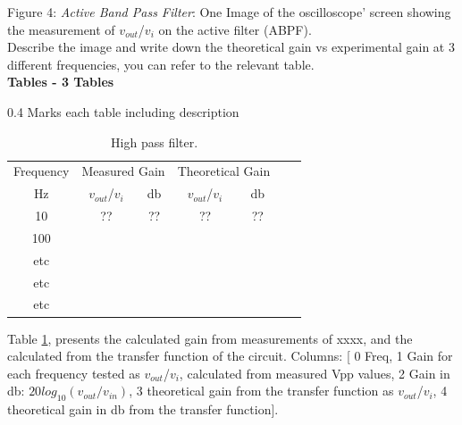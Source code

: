 \documentclass[journal]{IEEEtran}
\begin{document}
Figure 4: {\it Active Band Pass Filter}: One Image of the oscilloscope' screen showing the measurement of $v_{out}$/$v_i$ on the active filter (ABPF).\\
Describe the image and write down the theoretical gain vs experimental gain at 3 different frequencies, you can refer to the relevant table.\\


{\bf Tables - 3 Tables}
\begin{flushright} 0.4 Marks each table including description\end{flushright}

\begin{table}[!ht] %
\centering
\caption{High pass filter.}
\begin{tabular}{ccccccc}
Frequency & \multicolumn{2}{l}{Measured Gain} & \multicolumn{2}{l}{Theoretical Gain} \\
Hz   & $v_{out}$/$v_i$    & db     & $v_{out}$/$v_i$  & db           \\ \hline
10   & ??  &  ??           & ??   & ??       \\
100       &                                   &              &                                 &                              \\
etc &  &   &           &      \\                       
etc &  &   &           &      \\  
etc &  &   &           &      

\end{tabular}
\label{table:Exps1}
\end{table}

Table \ref{table:Exps1}, presents the calculated gain from measurements of xxxx, and the calculated from the transfer function of the circuit. Columns: [ 0 Freq, 1 Gain for each frequency tested as $v_{out}$/$v_i$, calculated from measured Vpp values,  2 Gain in db: $20log_{10}(v_{out}/v_{in})$, 3 theoretical gain from the transfer function as $v_{out}$/$v_i$, 4 theoretical gain in db from the transfer function].
\end{document}
